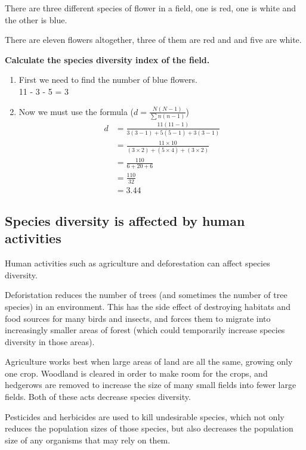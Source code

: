 \documentclass{article}
\begin{document}
There are three different species of flower in a field, one is red, one is white
and the other is blue.

There are eleven flowers altogether, three of them are red and and five are white.

{\bf Calculate the species diversity index of the field.}

\begin{enumerate}

	\item First we need to find the number of blue flowers.\\
		  11 - 3 - 5 = 3
	\item Now we must use the formula ($d = \frac{N(N-1)}{\sum n(n-1)}$)\\
		  \[
		  	\begin{split}
		  	d &= \frac{11(11-1)}{3(3-1) + 5(5-1) + 3(3-1)}\\
		  	  &= \frac{11\times10}{(3\times2) + (5\times4) + (3\times2)}\\
		  	  &= \frac{110}{6 + 20 + 6}\\
		  	  &= \frac{110}{32}\\
		  	  &= 3.44
		  	\end{split}
		  \]

\end{enumerate}

\subsection{Species diversity is affected by human activities}

Human activities such as agriculture and deforestation can affect species
diversity.

Deforistation reduces the number of trees (and sometimes the number of tree
species) in an environment. This has the side effect of destroying habitats and
food sources for many birds and insects, and forces them to migrate into
increasingly smaller areas of forest (which could temporarily increase species
diversity in those areas).

Agriculture works best when large areas of land are all the same, growing only
one crop. Woodland is cleared in order to make room for the crops, and hedgerows
are removed to increase the size of many small fields into fewer large fields.
Both of these acts decrease species diversity.

Pesticides and herbicides are used to kill undesirable species, which not only
reduces the population sizes of those species, but also decreases the population
size of any organisms that may rely on them.
\end{document}
